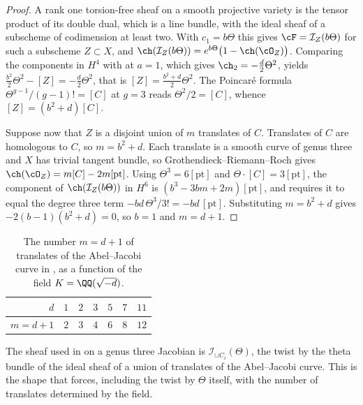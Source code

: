 \begin{proof}
A rank one torsion-free sheaf on a smooth projective variety is the tensor
product of its double dual, which is a line bundle, with the ideal sheaf of a
subscheme of codimension at least two. With $c_{1}=b\Theta$ this gives
$\cF=\mathcal{I}_{Z}(b\Theta)$ for such a subscheme $Z\subset X$, and
$\ch(\mathcal{I}_{Z}(b\Theta))=e^{b\Theta}\bigl(1-\ch(\cO_{Z})\bigr)$.
Comparing the components in $H^{4}$ with  at $a=1$,
which gives $\ch_{2}=-\tfrac{d}{2}\Theta^{2}$, yields
$\tfrac{b^{2}}{2}\Theta^{2}-[Z]=-\tfrac{d}{2}\Theta^{2}$, that is
$[Z]=\tfrac{b^{2}+d}{2}\Theta^{2}$. The Poincar\'e formula
$\Theta^{g-1}/(g-1)!=[C]$ at $g=3$ reads $\Theta^{2}/2=[C]$, whence
$[Z]=(b^{2}+d)[C]$.

Suppose now that $Z$ is a disjoint union of $m$ translates of $C$. Translates
of $C$ are homologous to $C$, so $m=b^{2}+d$. Each translate is a smooth curve
of genus three and $X$ has trivial tangent bundle, so Grothendieck--Riemann--Roch
gives $\ch(\cO_{Z})=m[C]-2m[\mathrm{pt}]$. Using $\Theta^{3}=6[\mathrm{pt}]$
and $\Theta\cdot[C]=3[\mathrm{pt}]$, the component of
$\ch(\mathcal{I}_{Z}(b\Theta))$ in $H^{6}$ is
$(b^{3}-3bm+2m)[\mathrm{pt}]$, and  requires it to
equal the degree three term $-bd\,\Theta^{3}/3!=-bd\,[\mathrm{pt}]$.
Substituting $m=b^{2}+d$ gives $-2(b-1)(b^{2}+d)=0$, so $b=1$ and $m=d+1$.
\end{proof}

\begin{table}[htbp]
\centering
\renewcommand{\arraystretch}{1.15}
\begin{tabular}{@{}rrrrrrr@{}}
\toprule
$d$ & $1$ & $2$ & $3$ & $5$ & $7$ & $11$ \\
\midrule
$m=d+1$ & $2$ & $3$ & $4$ & $6$ & $8$ & $12$ \\
\bottomrule
\end{tabular}
\caption{The number $m=d+1$ of translates of the Abel--Jacobi curve in
, as a function of the field $K=\QQ(\sqrt{-d})$.}
\label{tab:translates}
\end{table}

\begin{remark}\label{rem:markmancheck}
The sheaf used in \cite{Mar25b} on a genus three Jacobian is
$\mathcal{I}_{\cup C_{i}}(\Theta)$, the twist by the theta bundle of the ideal
sheaf of a union of translates of the Abel--Jacobi curve. This is the shape
that  forces, including the twist by $\Theta$ itself, with
the number of translates determined by the field.
\end{remark}

